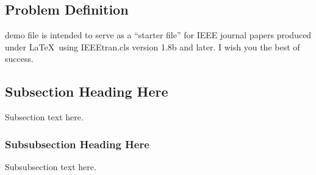 \subsection{Problem Definition}

         demo file is intended to serve as a ``starter file''
        for IEEE journal papers produced under \LaTeX\ using
        IEEEtran.cls version 1.8b and later.
        I wish you the best of success.

        

        \subsection{Subsection Heading Here}
        Subsection text here.

        \cite{MichaelHemsworth2019}
        \cite{DUNSTALL2008a}

        \subsubsection{Subsubsection Heading Here}
        Subsubsection text here.